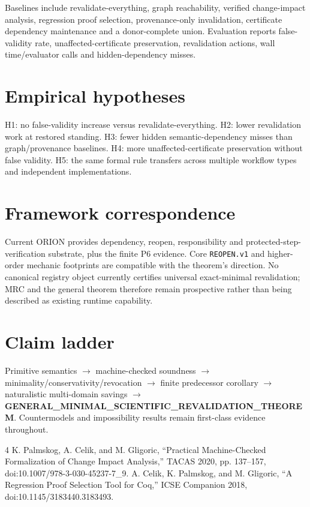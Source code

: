 \documentclass[11pt]{article}
\begin{document}
Baselines include revalidate-everything, graph reachability, verified change-impact analysis, regression proof selection, provenance-only invalidation, certificate dependency maintenance and a donor-complete union. Evaluation reports false-validity rate, unaffected-certificate preservation, revalidation actions, wall time/evaluator calls and hidden-dependency misses.

\section{Empirical hypotheses}
H1: no false-validity increase versus revalidate-everything. H2: lower revalidation work at restored standing. H3: fewer hidden semantic-dependency misses than graph/provenance baselines. H4: more unaffected-certificate preservation without false validity. H5: the same formal rule transfers across multiple workflow types and independent implementations.

\section{Framework correspondence}
Current ORION provides dependency, reopen, responsibility and protected-step-verification substrate, plus the finite P6 evidence. Core \texttt{REOPEN.v1} and higher-order mechanic footprints are compatible with the theorem's direction. No canonical registry object currently certifies universal exact-minimal revalidation; MRC and the general theorem therefore remain prospective rather than being described as existing runtime capability.

\section{Claim ladder}
Primitive semantics $\rightarrow$ machine-checked soundness $\rightarrow$ minimality/conservativity/revocation $\rightarrow$ finite predecessor corollary $\rightarrow$ naturalistic multi-domain savings $\rightarrow$ \textbf{GENERAL\_MINIMAL\_SCIENTIFIC\_REVALIDATION\_THEOREM}. Countermodels and impossibility results remain first-class evidence throughout.

\begin{thebibliography}{4}
 K. Palmskog, A. Celik, and M. Gligoric, ``Practical Machine-Checked Formalization of Change Impact Analysis,'' TACAS 2020, pp. 137--157, doi:10.1007/978-3-030-45237-7\_9.
 A. Celik, K. Palmskog, and M. Gligoric, ``A Regression Proof Selection Tool for Coq,'' ICSE Companion 2018, doi:10.1145/3183440.3183493.
\end{thebibliography}
\end{document}

